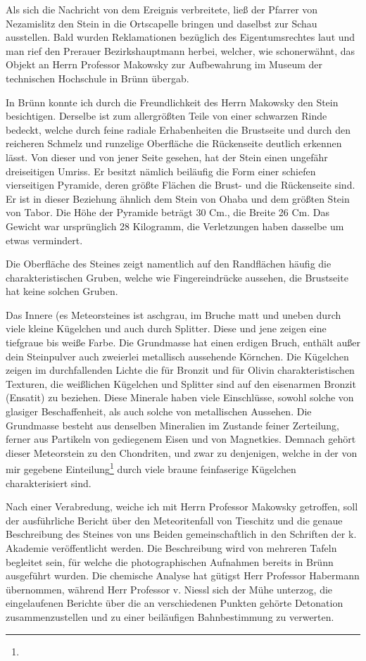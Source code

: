 \documentclass[a4paper, 11pt, oneside]{article}
\begin{document}
Als sich die Nachricht von dem Ereignis verbreitete, ließ der Pfarrer von Nezamislitz den Stein in die Ortscapelle bringen und daselbst zur Schau ausstellen. Bald wurden Reklamationen bezüglich des Eigentumsrechtes laut und man rief den Prerauer Bezirkshauptmann herbei, welcher, wie schonerwähnt, das Objekt an Herrn Professor Makowsky zur Aufbewahrung im Museum der technischen Hochschule in Brünn übergab.

In Brünn konnte ich durch die Freundlichkeit des Herrn Makowsky den Stein besichtigen. Derselbe ist zum allergrößten Teile von einer schwarzen Rinde bedeckt, welche durch feine radiale Erhabenheiten die Brustseite und durch den reicheren Schmelz und runzelige Oberfläche die Rückenseite deutlich erkennen lässt. Von dieser und von jener Seite gesehen, hat der Stein einen ungefähr dreiseitigen Umriss. Er besitzt nämlich beiläufig die Form einer schiefen vierseitigen Pyramide, deren größte Flächen die Brust- und die Rückenseite sind. Er ist in dieser Beziehung ähnlich dem Stein von Ohaba und dem größten Stein von Tabor. Die Höhe der Pyramide beträgt 30 Cm., die Breite 26 Cm. Das Gewicht war ursprünglich 28 Kilogramm, die Verletzungen haben dasselbe um etwas vermindert.

Die Oberfläche des Steines zeigt namentlich auf den Randflächen häufig die charakteristischen Gruben, welche wie Fingereindrücke aussehen, die Brustseite hat keine solchen Gruben.

Das Innere (es Meteorsteines ist aschgrau, im Bruche matt und uneben durch viele kleine Kügelchen und auch durch Splitter. Diese und jene zeigen eine tiefgraue bis weiße Farbe. Die Grundmasse hat einen erdigen Bruch, enthält außer dein Steinpulver auch zweierlei metallisch aussehende Körnchen. Die Kügelchen zeigen im durchfallenden Lichte die für Bronzit und für Olivin charakteristischen Texturen, die weißlichen Kügelchen und Splitter sind auf den eisenarmen Bronzit (Ensatit) zu beziehen. Diese Minerale haben viele Einschlüsse, sowohl solche von glasiger Beschaffenheit, als auch solche von metallischen Aussehen. Die Grundmasse besteht aus denselben Mineralien im Zustande feiner Zerteilung, ferner aus Partikeln von gediegenem Eisen und von Magnetkies. Demnach gehört dieser Meteorstein zu den Chondriten, und zwar zu denjenigen, welche in der von mir gegebene Einteilung\footnote{} durch viele braune feinfaserige Kügelchen charakterisiert sind.

Nach einer Verabredung, weiche ich mit Herrn Professor Makowsky getroffen, soll der ausführliche Bericht über den Meteoritenfall von Tieschitz und die genaue Beschreibung des Steines von uns Beiden gemeinschaftlich in den Schriften der k. Akademie veröffentlicht werden. Die Beschreibung wird von mehreren Tafeln begleitet sein, für welche die photographischen Aufnahmen bereits in Brünn ausgeführt wurden. Die chemische Analyse hat gütigst Herr Professor Habermann übernommen, während Herr Professor v. Niessl sich der Mühe unterzog, die eingelaufenen Berichte über die an verschiedenen Punkten gehörte Detonation zusammenzustellen und zu einer beiläufigen Bahnbestimmung zu verwerten.
\end{document}
